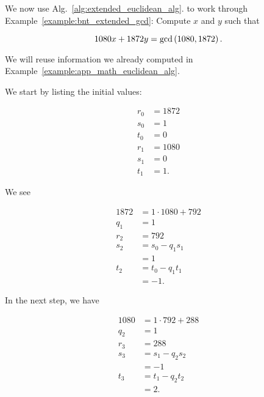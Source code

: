 \begin{example}
\label{example:app_math_extended_euclidean_alg}

We now use Alg.~\ref{alg:extended_euclidean_alg}.
to work through Example~\ref{example:bnt_extended_gcd}:
Compute $x$ and $y$ such that

\begin{equation}
    1080x + 1872y = \gcd\left( 1080,1872 \right).
\end{equation}

\noindent
We will reuse information we already computed in
Example~\ref{example:app_math_euclidean_alg}.

We start by listing the initial values:

\begin{align}
    r_{0} &= 1872
        \nonumber\\
    s_{0} &= 1
        \nonumber\\
    t_{0} &= 0
        \nonumber\\
    r_{1} &= 1080
        \nonumber\\
    s_{1} &= 0
        \nonumber\\
    t_{1} &= 1.
\end{align}

\noindent
We see

\begin{align}
    1872 &= 1\cdot1080 + 792
        \nonumber\\
    q_{1} &= 1
        \nonumber\\
    r_{2} &= 792
        \nonumber\\
    s_{2} &= s_{0} - q_{1}s_{1}
            \nonumber\\
        &= 1
            \nonumber\\
    t_{2} &= t_{0} - q_{1}t_{1}
            \nonumber\\
        &= -1.
\end{align}

\noindent
In the next step, we have

\begin{align}
    1080 &= 1\cdot792 + 288
        \nonumber\\
    q_{2} &= 1
        \nonumber\\
    r_{3} &= 288
        \nonumber\\
    s_{3} &= s_{1} - q_{2}s_{2}
            \nonumber\\
        &= -1
            \nonumber\\
    t_{3} &= t_{1} - q_{2}t_{2}
            \nonumber\\
        &= 2.
\end{align}


\end{example}
